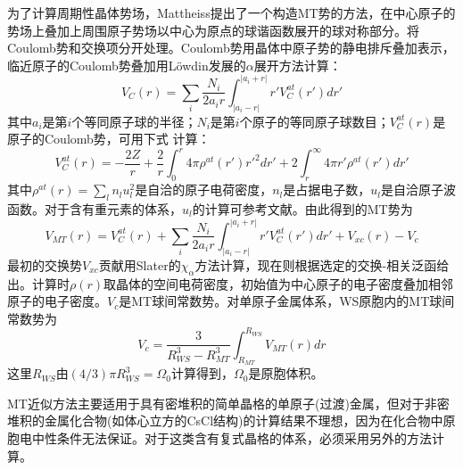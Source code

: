 为了计算周期性晶体势场，Mattheiss提出了一个构造MT势的方法，在中心原子的势场上叠加上周围原子势场以中心为原点的球谐函数展开的球对称部分\cite{PRA133-1399_1964}。将Coulomb势和交换项分开处理。Coulomb势用晶体中原子势的静电排斥叠加表示，临近原子的Coulomb势叠加用L\"owdin发展的$\alpha$展开方法计算：
\begin{equation}
  V_C(r)=\sum_i\dfrac{N_i}{2a_ir}\int_{|a_i-r|}^{|a_i+r|}r'V_C^{at}(r')dr'
  \label{eq:lodin-alpha}
\end{equation}
其中$a_i$是第$i$个等同原子球的半径；$N_i$是第$i$个原子的等同原子球数目；$V_C^{at}(r)$是原子的Coulomb势，可用下式%
计算：
\begin{equation}
  V_C^{at}(r)=-\dfrac{2Z}r+\frac2r\int_0^r4\pi\rho^{at}(r')r'^2dr'+2\int_r^{\infty}4\pi r'\rho^{at}(r')dr'
  \label{eq:atomic-coulomb}
\end{equation}
其中$\rho^{at}(r)=\sum\limits_l n_lu_l^2$是自洽的原子电荷密度，$n_l$是占据电子数，$u_l$是自洽原子波函数\cite{Herman-Skillman}。对于含有重元素的体系，$u_l$的计算可参考文献。由此得到的MT势为
\begin{equation}
  V_{MT}(r)=V_C^{at}(r)+\sum_i\dfrac{N_i}{2a_ir}\int_{|a_i-r|}^{|a_i+r|}r'V_C^{at}(r')dr'+V_{xc}(r)-V_c
  \label{eq:potential-MT}
\end{equation}
最初的交换势$V_{xc}$贡献用Slater的$\chi_{\alpha}$方法计算\cite{PR81-385_1951}，现在则根据选定的交换-相关泛函给出。计算时$\rho(r)$取晶体的空间电荷密度，初始值为中心原子的电子密度叠加相邻原子的电子密度。$V_c$是MT球间常数势。对单原子金属体系，WS原胞内的MT球间常数势为
\begin{equation}
  V_c=\dfrac3{R_{WS}^3-R_{MT}^3}\int_{R_{MT}}^{R_{WS}}V_{MT}(r)dr
  \label{eq:monoatomic-ini}
\end{equation}
这里$R_{WS}$由$(4/3)\pi R_{WS}^3=\Omega_0$计算得到，$\Omega_0$是原胞体积。

MT近似方法主要适用于具有密堆积的简单晶格的单原子(过渡)金属\cite{SSP26-104_1971}，但对于非密堆积的金属化合物(如体心立方的CsCl结构)\cite{PRB13-5362_1976}的计算结果不理想，因为在化合物中原胞电中性条件无法保证。对于这类含有复式晶格的体系，必须采用另外的方法计算\cite{PSSB36-447_1969}。

